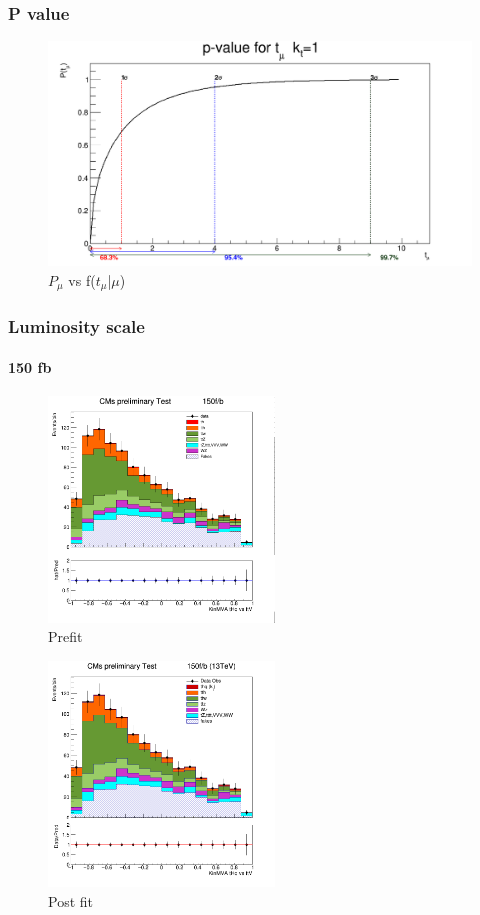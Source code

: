 \documentclass[11pt]{beamer}
\begin{document}
\begin{frame}
\frametitle{P value}
\begin{center}
\begin{figure}
\includegraphics[scale=0.25]{figures/nos.png}
\caption{$P_\mu$ vs  f($t_\mu$|$\mu$)}	
\end{figure}
\end{center}
\end{frame}

\begin{frame}
\frametitle{Luminosity scale}
\framesubtitle{150 fb}
\begin{multicols}{2}
\begin{center}
	\begin{figure}
		\includegraphics[width=6cm,height=6cm]{figures/150fb/kin.png}
		\caption*{Prefit }
	\end{figure}
\end{center}
\columnbreak
\begin{center}
	\begin{figure}
		\includegraphics[width=6cm,height=6cm]{figures/150fb/simple.png}
		\caption*{Post fit }
	\end{figure}
\end{center}
\end{multicols}
\end{frame}
\end{document}
